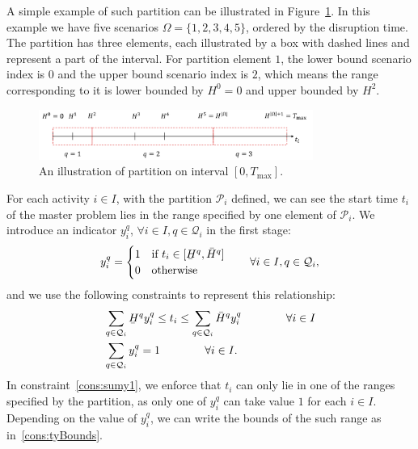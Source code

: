 \documentclass[11pt]{article}
\newcommand{\noi}{\noindent}
\renewcommand{\underbar}{\underaccent{\bar}}
\begin{document}
	\noi A simple example of such partition can be illustrated in Figure~\ref{fig:simplePart}. In this example we have five scenarios \(\Omega = \{1,2,3,4,5\}\), ordered by the disruption time. The partition has three elements, each illustrated by a box with dashed lines and represent a part of the interval. For partition element \(1\), the lower bound scenario index is \(0\) and the upper bound scenario index is \(2\), which means the range corresponding to it is lower bounded by \(H^0 = 0\) and upper bounded by \(H^2\).
	\begin{figure}[H]
		\centering
		\includegraphics[width=0.8\textwidth]{simplePart}
		\caption{An illustration of partition on interval \([0,T_{\max}]\).}
		\label{fig:simplePart}
	\end{figure}
	\noi For each activity \(i \in I\), with the partition \(\mathcal{P}_i\) defined, we can see the start time \(t_i\) of the master problem lies in the range specified by one element of \(\mathcal{P}_i\). We introduce an indicator \(y_i^q\), \(\forall i \in I, q \in \mathcal{Q}_i\) in the first stage:
	\begin{equation}
	y_i^q = \begin{cases}
	1 & \text{if \(t_i \in [\underbar{H}^q,\bar{H}^q]\)}\\
	0 & \text{otherwise}
	\end{cases}
	\qquad \forall i \in I, q \in \mathcal{Q}_i,
	\end{equation}
	and we use the following constraints to represent this relationship:
	\begin{subequations} \label{cons:yCons}
		\begin{align}
		& \sum_{q \in \mathcal{Q}_i} \underbar{H}^q y_i^{q} \leq t_i \leq \sum_{q \in \mathcal{Q}_i} \bar{H}^q y_i^{q} \qquad \qquad \forall i \in I \label{cons:tyBounds}\\
		& \sum_{q \in \mathcal{Q}_i} y_i^q = 1 \qquad \qquad \forall i \in I. \label{cons:sumy1}
		\end{align}
	\end{subequations}
	In constraint~\eqref{cons:sumy1}, we enforce that \(t_i\) can only lie in one of the ranges specified by the partition, as only one of \(y_i^q\) can take value \(1\) for each \(i \in I\). Depending on the value of \(y_i^q\), we can write the bounds of the such range as in~\eqref{cons:tyBounds}. \\
\end{document}
